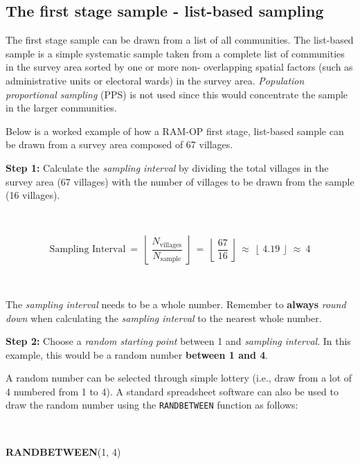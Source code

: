 \documentclass[12pt,a4paper]{book}
\newenvironment{Shaded}{\begin{snugshade}}{\end{snugshade}}
\newcommand{\DecValTok}[1]{\textcolor[rgb]{0.00,0.00,0.81}{#1}}
\newcommand{\KeywordTok}[1]{\textcolor[rgb]{0.13,0.29,0.53}{\textbf{#1}}}
\newcommand{\NormalTok}[1]{#1}
\begin{document}
\hypertarget{the-first-stage-sample---list-based-sampling}{%
\subsection{The first stage sample - list-based sampling}\label{the-first-stage-sample---list-based-sampling}}

The first stage sample can be drawn from a list of all communities. The list-based sample is a simple systematic sample taken from a complete list of communities in the survey area sorted by one or more non- overlapping spatial factors (such as administrative units or electoral wards) in the survey area. \emph{Population proportional sampling} (PPS) is not used since this would concentrate the sample in the larger communities.

Below is a worked example of how a RAM-OP first stage, list-based sample can be drawn from a survey area composed of 67 villages.

\textbf{Step 1:} Calculate the \emph{sampling interval} by dividing the total villages in the survey area (67 villages) with the number of villages to be drawn from the sample (16 villages).

~

\[\text{Sampling Interval} ~ = ~ \left \lfloor ~ \frac{N_{\text{villages}}}{N_{\text{sample}}} ~ \right \rfloor ~ = ~ \left \lfloor ~ \frac{67}{16} ~ \right \rfloor ~ \approx ~ \left \lfloor ~ 4.19 ~ \right \rfloor ~ \approx ~ 4\]

~

The \emph{sampling interval} needs to be a whole number. Remember to \textbf{always} \emph{round down} when calculating the \emph{sampling interval} to the nearest whole number.

\textbf{Step 2:} Choose a \emph{random starting point} between 1 and \emph{sampling interval}. In this example, this would be a random number \textbf{between 1 and 4}.

A random number can be selected through simple lottery (i.e., draw from a lot of 4 numbered from 1 to 4). A standard spreadsheet software can also be used to draw the random number using the \texttt{RANDBETWEEN} function as follows:

~

\begin{Shaded}
\begin{Highlighting}[]
\KeywordTok{RANDBETWEEN}\NormalTok{(}\DecValTok{1}\NormalTok{, }\DecValTok{4}\NormalTok{)}
\end{Highlighting}
\end{Shaded}
\end{document}
